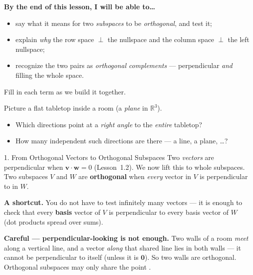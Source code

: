 \documentclass[10pt]{article}
\newcommand{\vv}{\mathbf{v}}
\newcommand{\ww}{\mathbf{w}}
\newcommand{\zero}{\mathbf{0}}
\begin{document}
\namedateperiod

\vspace{0.12in}

\begin{objectivebox}
\textbf{By the end of this lesson, I will be able to\dots}
\begin{itemize}\setlength{\itemsep}{2pt}
  \item say what it means for two \emph{subspaces} to be \emph{orthogonal}, and test it;
  \item explain \emph{why} the row space $\perp$ the nullspace and the column space $\perp$ the left nullspace;
  \item recognize the two pairs as \emph{orthogonal complements} --- perpendicular \emph{and} filling the whole space.
\end{itemize}
\end{objectivebox}

\vspace{0.06in}

\begin{vocabbox}
\small
Fill in each term as we build it together.
\vspace{2pt}
\end{vocabbox}

\begin{hookbox}
Picture a flat tabletop inside a room (a \emph{plane} in $\mathbb{R}^3$).
\begin{itemize}\setlength{\itemsep}{1pt}
  \item Which directions point at a \emph{right angle} to the \emph{entire} tabletop? \writeline
  \item How many independent such directions are there --- a line, a plane, \dots? \writeline
\end{itemize}
\end{hookbox}

\begin{notesbox}{1. From Orthogonal Vectors to Orthogonal Subspaces}
Two \emph{vectors} are perpendicular when $\vv\cdot\ww=0$ (Lesson~1.2). We now lift this to whole
subspaces. Two subspaces $V$ and $W$ are \textbf{orthogonal} when \emph{every} vector in $V$ is
perpendicular to \blank{4.6cm} in $W$.

\vspace{3pt}
\textbf{A shortcut.} You do not have to test infinitely many vectors --- it is enough to check that
every \textbf{basis} vector of $V$ is perpendicular to every basis vector of $W$ (dot products spread
over sums).

\vspace{3pt}
\textbf{Careful --- perpendicular-looking is not enough.} Two walls of a room \emph{meet} along a
vertical line, and a vector \emph{along} that shared line lies in both walls --- it cannot be
perpendicular to itself (unless it is $\zero$). So two walls are \blank{2.4cm} orthogonal. Orthogonal
subspaces may only share the point \blank{1.2cm}.
\end{notesbox}
\end{document}
